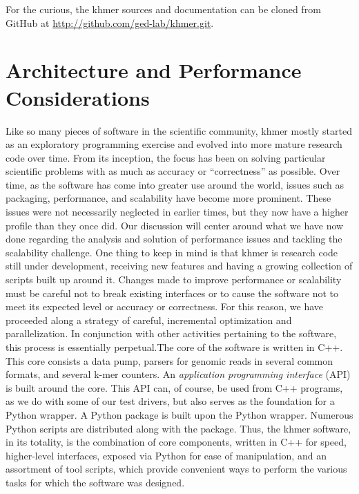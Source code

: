 \documentclass{article}
\newcommand{\comment}[2]{#2}
\begin{document}
For the curious, the khmer sources and documentation can be cloned from GitHub at \url{http://github.com/ged-lab/khmer.git}.

\section{Architecture and Performance Considerations}

Like so many pieces of software in the scientific community, khmer mostly started as an exploratory programming exercise and evolved into more mature research code over time. From its inception, the focus has been on solving particular scientific problems with as much as accuracy or ``correctness'' as possible. Over time, as the software has come into greater use around the world, issues such as packaging, performance, and scalability have become more prominent. These issues were not necessarily neglected in earlier times, but they now have a higher profile than they once did. Our discussion will center around what we have now done regarding the analysis and solution of performance issues and tackling the scalability challenge. One thing to keep in mind is that khmer is research code still under development, receiving new features and having a growing collection of scripts built up around it. \comment{Rework passive voice.} Changes made to improve performance or scalability must be careful not to break existing interfaces or to cause the software not to meet its expected level or accuracy or correctness. For this reason, we have proceeded along a strategy of careful, incremental optimization and parallelization. In conjunction with other activities pertaining to the software, this process is essentially perpetual.\comment{This is good. It is important to emphasize what kind of software life-stage optimization should be happening in. That is, maintenance.}


The core of the software is written in C++. This core consists a data pump, parsers for genomic reads in several common formats, and several k-mer counters. An \textit{application programming interface} (API) is built around the core. This API can, of course, be used from C++ programs, as we do with some of our test drivers, but also serves as the foundation for a Python wrapper. A Python package is built upon the Python wrapper. Numerous Python scripts are distributed along with the package. Thus, the khmer software, in its totality, is the combination of core components, written in C++ for speed, higher-level interfaces, exposed via Python for ease of manipulation, and an assortment of tool scripts, which provide convenient ways to perform the various tasks for which the software was designed.
\end{document}
